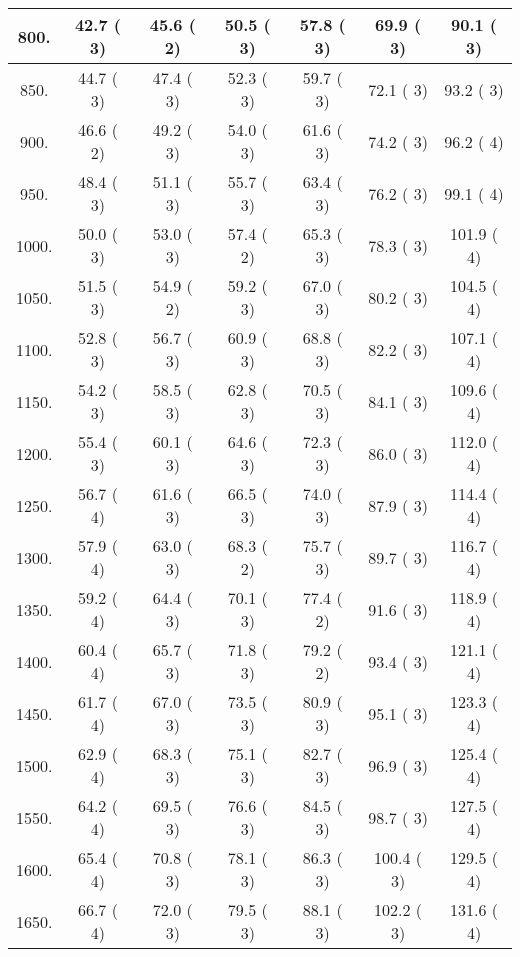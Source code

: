 \begin{tabular}{|c||c|c|c|c|c|c|}
\hline
  800. &    42.7 (      3) &    45.6 (      2) &    50.5 (      3) &    57.8 (      3) &    69.9 (      3) &    90.1 (      3)\tabularnewline
\hline
  850. &    44.7 (      3) &    47.4 (      3) &    52.3 (      3) &    59.7 (      3) &    72.1 (      3) &    93.2 (      3)\tabularnewline
\hline
  900. &    46.6 (      2) &    49.2 (      3) &    54.0 (      3) &    61.6 (      3) &    74.2 (      3) &    96.2 (      4)\tabularnewline
\hline
  950. &    48.4 (      3) &    51.1 (      3) &    55.7 (      3) &    63.4 (      3) &    76.2 (      3) &    99.1 (      4)\tabularnewline
\hline
 1000. &    50.0 (      3) &    53.0 (      3) &    57.4 (      2) &    65.3 (      3) &    78.3 (      3) &   101.9 (      4)\tabularnewline
\hline
 1050. &    51.5 (      3) &    54.9 (      2) &    59.2 (      3) &    67.0 (      3) &    80.2 (      3) &   104.5 (      4)\tabularnewline
\hline
 1100. &    52.8 (      3) &    56.7 (      3) &    60.9 (      3) &    68.8 (      3) &    82.2 (      3) &   107.1 (      4)\tabularnewline
\hline
 1150. &    54.2 (      3) &    58.5 (      3) &    62.8 (      3) &    70.5 (      3) &    84.1 (      3) &   109.6 (      4)\tabularnewline
\hline
 1200. &    55.4 (      3) &    60.1 (      3) &    64.6 (      3) &    72.3 (      3) &    86.0 (      3) &   112.0 (      4)\tabularnewline
\hline
 1250. &    56.7 (      4) &    61.6 (      3) &    66.5 (      3) &    74.0 (      3) &    87.9 (      3) &   114.4 (      4)\tabularnewline
\hline
 1300. &    57.9 (      4) &    63.0 (      3) &    68.3 (      2) &    75.7 (      3) &    89.7 (      3) &   116.7 (      4)\tabularnewline
\hline
 1350. &    59.2 (      4) &    64.4 (      3) &    70.1 (      3) &    77.4 (      2) &    91.6 (      3) &   118.9 (      4)\tabularnewline
\hline
 1400. &    60.4 (      4) &    65.7 (      3) &    71.8 (      3) &    79.2 (      2) &    93.4 (      3) &   121.1 (      4)\tabularnewline
\hline
 1450. &    61.7 (      4) &    67.0 (      3) &    73.5 (      3) &    80.9 (      3) &    95.1 (      3) &   123.3 (      4)\tabularnewline
\hline
 1500. &    62.9 (      4) &    68.3 (      3) &    75.1 (      3) &    82.7 (      3) &    96.9 (      3) &   125.4 (      4)\tabularnewline
\hline
 1550. &    64.2 (      4) &    69.5 (      3) &    76.6 (      3) &    84.5 (      3) &    98.7 (      3) &   127.5 (      4)\tabularnewline
\hline
 1600. &    65.4 (      4) &    70.8 (      3) &    78.1 (      3) &    86.3 (      3) &   100.4 (      3) &   129.5 (      4)\tabularnewline
\hline
 1650. &    66.7 (      4) &    72.0 (      3) &    79.5 (      3) &    88.1 (      3) &   102.2 (      3) &   131.6 (      4)\tabularnewline

\end{tabular}
